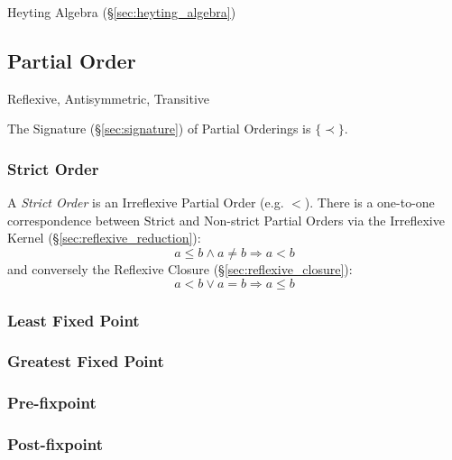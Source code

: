 Heyting Algebra (\S\ref{sec:heyting_algebra})



\subsection{Partial Order}\label{sec:partial_order}

Reflexive, Antisymmetric, Transitive

The Signature (\S\ref{sec:signature}) of Partial Orderings is
$\{\prec\}$.



\subsubsection{Strict Order}\label{sec:strict_order}

A \emph{Strict Order} is an Irreflexive Partial Order (e.g. $<$).
There is a one-to-one correspondence between Strict and Non-strict
Partial Orders via the Irreflexive Kernel
(\S\ref{sec:reflexive_reduction}):
\[
  a \leq b \wedge a \neq b \Rightarrow a < b
\]
and conversely the Reflexive Closure (\S\ref{sec:reflexive_closure}):
\[
  a < b \vee a = b \Rightarrow a \leq b
\]



\subsubsection{Least Fixed Point}\label{sec:least_fixedpoint}

\subsubsection{Greatest Fixed Point}\label{sec:greatest_fixedpoint}

\subsubsection{Pre-fixpoint}\label{sec:prefixpoint}

\subsubsection{Post-fixpoint}\label{sec:postfixpoint}



